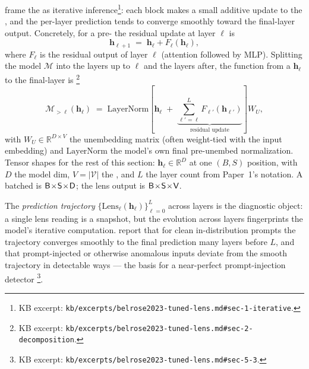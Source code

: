 \citet{belrose2023-tuned-lens} frame the  as iterative
inference\footnote{KB excerpt: \texttt{kb/excerpts/belrose2023-tuned-lens.md\#sec-1-iterative}.}:
each block makes a small additive update to the , and
the per-layer prediction tends to converge smoothly toward the
final-layer output. Concretely, for a pre-  the
residual update at layer $\ell$ is
\begin{equation}
  \mathbf{h}_{\ell+1} \;=\; \mathbf{h}_\ell + F_\ell(\mathbf{h}_\ell),
  \label{eq:residual-update}
\end{equation}
where $F_\ell$ is the residual output of layer $\ell$ (attention
followed by MLP). Splitting the model $\mathcal{M}$ into the layers up
to $\ell$ and the layers after, the function from a 
$\mathbf{h}_\ell$ to the final-layer  is
\citep[\S 2, Eq.~2]{belrose2023-tuned-lens}\footnote{KB excerpt:
\texttt{kb/excerpts/belrose2023-tuned-lens.md\#sec-2-decomposition}.}
\begin{equation}
  \mathcal{M}_{>\ell}(\mathbf{h}_\ell)
  \;=\;
  \mathrm{LayerNorm}\!\left[\mathbf{h}_\ell
  \;+\;\underbrace{\sum_{\ell'=\ell}^{L} F_{\ell'}(\mathbf{h}_{\ell'})}_{\text{residual update}}\right]\!W_U,
  \label{eq:residual-decomp}
\end{equation}
with $W_U \in \mathbb{R}^{D \times V}$ the unembedding matrix (often
weight-tied with the input embedding) and $\mathrm{LayerNorm}$ the
model's own final pre-unembed normalization. Tensor shapes for the
rest of this section:  $\mathbf{h}_\ell \in \mathbb{R}^D$
at one $(B, S)$ position, with $D$ the model dim, $V = |\mathcal{V}|$
the , and $L$ the layer count from Paper~1's notation. A
batched  is $\mathsf{B}\!\times\!\mathsf{S}\!\times\!\mathsf{D}$;
the lens output is $\mathsf{B}\!\times\!\mathsf{S}\!\times\!\mathsf{V}$.

The \emph{prediction trajectory}
$\{\mathrm{Lens}_\ell(\mathbf{h}_\ell)\}_{\ell=0}^L$ across layers is
the diagnostic object: a single lens reading is a snapshot, but the
evolution across layers fingerprints the model's iterative computation.
\citet[\S 1]{belrose2023-tuned-lens} report that for clean
in-distribution prompts the trajectory converges smoothly to the final
prediction many layers before $L$, and that prompt-injected or
otherwise anomalous inputs deviate from the smooth trajectory in
detectable ways — the basis for a near-perfect prompt-injection
detector \citep[\S 5.3]{belrose2023-tuned-lens}\footnote{KB excerpt:
\texttt{kb/excerpts/belrose2023-tuned-lens.md\#sec-5-3}.}.

